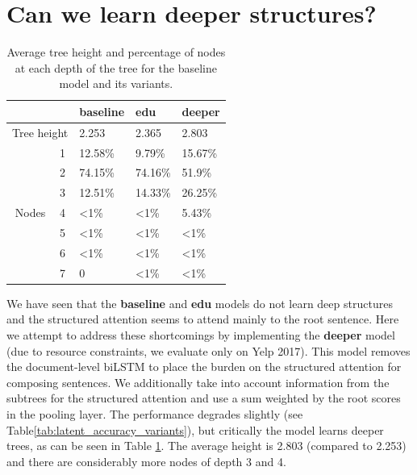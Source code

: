 \section{Can we learn deeper structures?} 
\begin{table}[t]
     \begin{center}
     \begin{tabular}{cllll}
     \toprule
                          &     & baseline   & edu & deeper \\ \hline\hline
\multicolumn{2}{l}{Tree height} & 2.253          & 2.365              &2.803           \\ \hline
\multirow{7}{*}{Nodes}   & 1   & 12.58\%        & 9.79\%             & 15.67\%         \\
                          & 2   & 74.15\%        & 74.16\%             & 51.9\%          \\
                          & 3   & 12.51\%        & 14.33\%              & 26.25\%          \\
                          & 4   & \textless{}1\% & \textless{}1\%      & 5.43\%          \\
                          & 5   & \textless{}1\% & \textless{}1\%                   & \textless{}1\%          \\
                          & 6   & \textless{}1\% & \textless{}1\%                   & \textless{}1\%           \\
                          & 7   & 0              & \textless{}1\%                   & \textless{}1\%        \\
                \bottomrule
                          
\end{tabular}
      \caption{Average tree height and percentage of nodes at each depth of the tree for the baseline model and its variants.}
      \label{tab:latent_treevariants}
      \end{center}
      \end{table}
      
We have seen that the \textbf{baseline} and \textbf{edu} models do not learn deep structures and the structured attention seems to attend mainly to the root sentence. Here we attempt to address these shortcomings by implementing the \textbf{deeper} model (due to resource constraints, we evaluate only on Yelp 2017). This model removes the document-level biLSTM to place the burden on the structured attention for composing sentences. We additionally take into account information from the subtrees for the structured attention and use a sum weighted by the root scores in the pooling layer. The performance degrades slightly (see Table\ref{tab:latent_accuracy_variants}), but critically the model learns deeper trees, as can be seen in Table \ref{tab:latent_treevariants}. The average height is 2.803 (compared to 2.253) and there are considerably more nodes of depth 3 and 4.

